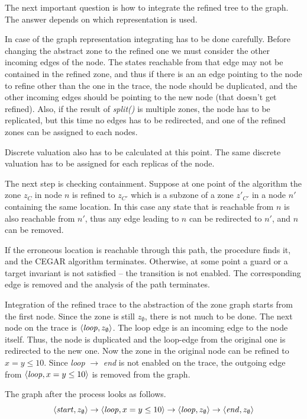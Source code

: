 \begin{runningExample}
The next important question is how to integrate the refined tree to the graph. The answer depends on which representation is used.

In case of the graph representation integrating has to be done carefully. Before changing the abstract zone to the refined one we must consider the other incoming edges of the node. The states reachable from that edge may not be contained in the refined zone, and thus if there is an an edge pointing to the node to refine other than the one in the trace, the node should be duplicated, and the other incoming edges should be pointing to the new node (that doesn't get refined). Also, if the result of \emph{split()} is multiple zones, the node has to be replicated, but this time no edges has to be redirected, and one of the refined zones can be assigned to each nodes.

Discrete valuation also has to be calculated at this point. The same discrete valuation has to be assigned for each replicas of the node.

The next step is checking containment. Suppose at one point of the
algorithm the zone $z_{C}$ in node $n$ %
 is 
refined to  $z_{C'}$ which is a
subzone of a zone $z'_{C'}$ in a node $n'$ containing the same location. In this case any state that is reachable from $n$ is also reachable from $n'$, thus any edge leading to  $n$ can be redirected to $n'$, and $n$ can be removed.

If the erroneous location is reachable through this path, the procedure finds it,
and the CEGAR algorithm terminates. Otherwise, at some point a guard or a target invariant
is not satisfied -- the transition is not enabled. The corresponding edge is removed and the analysis of the path terminates.

\begin{runningExample}
	Integration of the refined trace to the abstraction of the zone graph starts from the first node. Since the zone is still $z_\emptyset$, there is not much to be done. The next node on the trace is $\langle \text{\emph{loop}}, z_\emptyset \rangle$. The loop edge is an incoming edge to the node itself. Thus, the node is duplicated and the loop-edge from the original one is redirected to the new one. Now the zone in the original node can be refined to $x=y \leq 10$. Since \emph{loop} $\to$ \emph{end} is not enabled on the trace, the outgoing edge from $\langle \text{\emph{loop}}, x=y \leq 10 \rangle$ is removed from the graph.
	
	The graph after the process looks as follows.
	\[\langle \text{\emph{start}}, z_\emptyset \rangle \to \langle \text{\emph{loop}}, x=y \leq 10 \rangle \to \langle \text{\emph{loop}}, z_\emptyset \rangle \to \langle \text{\emph{end}}, z_\emptyset \rangle\]
\end{runningExample}


\end{runningExample}
